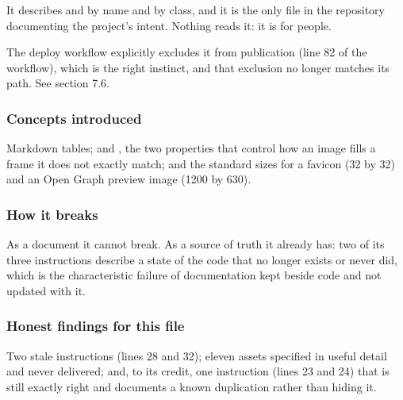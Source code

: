 It describes  and
 by name and by class, and it is the only
file in the repository documenting the project's intent. Nothing reads it: it is for
people.

The deploy workflow explicitly excludes it from publication (line 82 of the
workflow), which is the right instinct, and that exclusion no longer matches its
path. See section 7.6.

\subsubsection*{Concepts introduced}

Markdown tables;  and , the two properties
that control how an image fills a frame it does not exactly match; and the standard
sizes for a favicon (32 by 32) and an Open Graph preview image (1200 by 630).

\subsubsection*{How it breaks}

As a document it cannot break. As a source of truth it already has: two of its three
instructions describe a state of the code that no longer exists or never did, which
is the characteristic failure of documentation kept beside code and not updated with
it.

\subsubsection*{Honest findings for this file}

Two stale instructions (lines 28 and 32); eleven assets specified in useful detail
and never delivered; and, to its credit, one instruction (lines 23 and 24) that is
still exactly right and documents a known duplication rather than hiding it.
